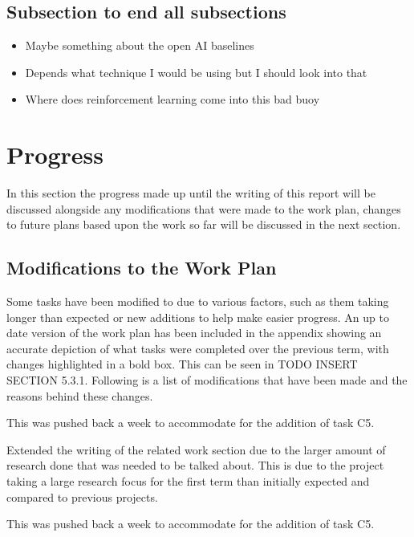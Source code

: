 \documentclass[a4paper]{article}
\begin{document}
\subsection{Subsection to end all subsections}
\begin{itemize}
    \item Maybe something about the open AI baselines
    \item Depends what technique I would be using but I should look into that
    \item Where does reinforcement learning come into this bad buoy
\end{itemize}

\section{Progress}
In this section the progress made up until the writing of this report will be discussed alongside any modifications that were made to the work plan, changes to future plans based upon the work so far will be discussed in the next section.
\subsection{Modifications to the Work Plan}
Some tasks have been modified to due to various factors, such as them taking longer than expected or new additions to help make easier progress.
An up to date version of the work plan has been included in the appendix showing an accurate depiction of what tasks were completed over the previous term, with changes highlighted in a bold box.
This can be seen in TODO INSERT SECTION 5.3.1.
Following is a list of modifications that have been made and the reasons behind these changes.
\begin{description}
\setlength{\itemsep}{0pt}
\setlength{\parskip}{0pt}
\item [\large{Documentation}]
\item [D4--Interim Report Outline Sections]
This was pushed back a week to accommodate for the addition of task C5.
\item [D5--Interim Report Related Work]
Extended the writing of the related work section due to the larger amount of research done that was needed to be talked about.
This is due to the project taking a large research focus for the first term than initially expected and compared to previous projects.
\item [D6--Interim Report Draft]
This was pushed back a week to accommodate for the addition of task C5.
\end{description}
\end{document}
